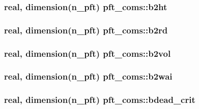 \subsubsection[{b2ht}]{\setlength{\rightskip}{0pt plus 5cm}real, dimension(n\+\_\+pft) pft\+\_\+coms\+::b2ht}\label{namespacepft__coms_a5c7b374e94930d3266444e1ef0539447}
\hypertarget{namespacepft__coms_abfac20b7a9e8b92da039ecc3b59dfdc3}{}
\subsubsection[{b2rd}]{\setlength{\rightskip}{0pt plus 5cm}real, dimension(n\+\_\+pft) pft\+\_\+coms\+::b2rd}\label{namespacepft__coms_abfac20b7a9e8b92da039ecc3b59dfdc3}
\hypertarget{namespacepft__coms_a54ac66449833305ba8a3c3415044856d}{}
\subsubsection[{b2vol}]{\setlength{\rightskip}{0pt plus 5cm}real, dimension(n\+\_\+pft) pft\+\_\+coms\+::b2vol}\label{namespacepft__coms_a54ac66449833305ba8a3c3415044856d}
\hypertarget{namespacepft__coms_a31ab705538ba69a865a41647d0bd5d63}{}
\subsubsection[{b2wai}]{\setlength{\rightskip}{0pt plus 5cm}real, dimension(n\+\_\+pft) pft\+\_\+coms\+::b2wai}\label{namespacepft__coms_a31ab705538ba69a865a41647d0bd5d63}
\hypertarget{namespacepft__coms_a321291df889682b63b1a09ff1affff18}{}
\subsubsection[{bdead\+\_\+crit}]{\setlength{\rightskip}{0pt plus 5cm}real, dimension(n\+\_\+pft) pft\+\_\+coms\+::bdead\+\_\+crit}\label{namespacepft__coms_a321291df889682b63b1a09ff1affff18}
\hypertarget{namespacepft__coms_a032c88698720a94f7bdeff271ae39844}{}
